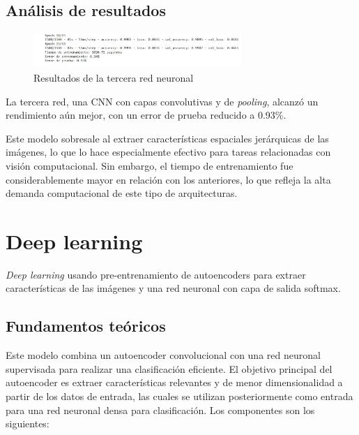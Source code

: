 \subsection{Análisis de resultados}

\begin{figure}[H]
	\centering
	\includegraphics[width=0.7\textwidth]{imgs/results-red3.JPG}
	\caption{Resultados de la tercera red neuronal}
	\label{fig:results-red3}
\end{figure}

La tercera red, una CNN con capas convolutivas y de \textit{pooling}, alcanzó un rendimiento aún mejor, con un error de prueba reducido a 0.93\%.

Este modelo sobresale al extraer características espaciales jerárquicas de las imágenes, lo que lo hace especialmente efectivo para tareas relacionadas con visión computacional. Sin embargo, el tiempo de entrenamiento fue considerablemente mayor en relación con los anteriores, lo que refleja la alta demanda computacional de este tipo de arquitecturas.

\section{Deep learning}

\textit{Deep learning} usando pre-entrenamiento de autoencoders para extraer características de las imágenes y una red neuronal con capa de salida softmax.

\subsection{Fundamentos teóricos}

Este modelo combina un autoencoder convolucional con una red neuronal supervisada para realizar una clasificación eficiente. El objetivo principal del autoencoder es extraer características relevantes y de menor dimensionalidad a partir de los datos de entrada, las cuales se utilizan posteriormente como entrada para una red neuronal densa para clasificación. Los componentes son los siguientes:

